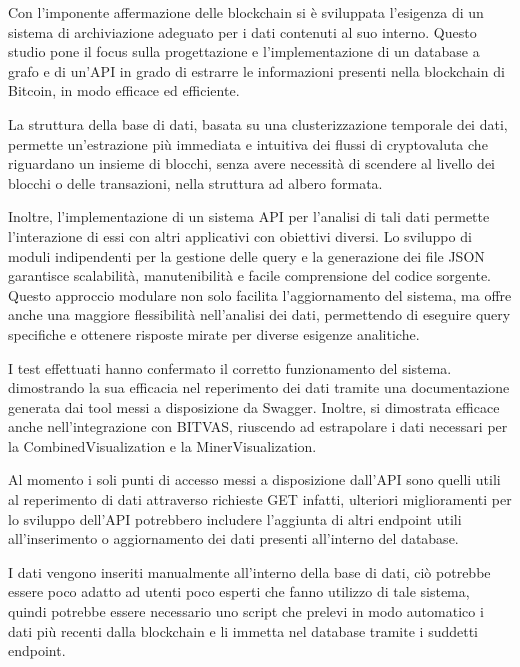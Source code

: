 
Con l'imponente affermazione delle blockchain si è  sviluppata l'esigenza di un sistema di archiviazione adeguato per i dati contenuti al suo interno.
Questo studio pone il focus sulla progettazione e l'implementazione di un database a grafo e di un'API in grado di estrarre le informazioni presenti nella blockchain di Bitcoin, in modo efficace ed efficiente.

La struttura della base di dati, basata su una clusterizzazione temporale dei dati, permette un'estrazione più immediata e intuitiva dei flussi di cryptovaluta che riguardano un insieme di blocchi, senza avere necessità di scendere al livello dei blocchi o delle transazioni, nella struttura ad albero formata.

Inoltre, l'implementazione di un sistema API per l'analisi di tali dati permette l'interazione di essi con altri applicativi con obiettivi diversi. Lo sviluppo di moduli indipendenti per la gestione delle query e la generazione dei file JSON  garantisce scalabilità, manutenibilità e facile comprensione del codice sorgente.
Questo approccio modulare non solo facilita l’aggiornamento del sistema, ma offre anche una maggiore flessibilità nell’analisi dei dati, permettendo di eseguire query specifiche e ottenere risposte mirate per diverse esigenze analitiche.

I test effettuati hanno confermato il corretto funzionamento del sistema. dimostrando la sua efficacia nel reperimento dei dati tramite una documentazione generata dai tool messi a disposizione da Swagger.
Inoltre, si  dimostrata efficace anche nell'integrazione con BITVAS, riuscendo ad estrapolare i dati necessari per la CombinedVisualization e la MinerVisualization.

Al momento i soli punti di accesso messi a disposizione dall'API sono quelli utili al reperimento di dati attraverso richieste GET infatti, ulteriori miglioramenti per lo sviluppo dell'API potrebbero includere l'aggiunta di altri endpoint utili all'inserimento o aggiornamento dei dati presenti all'interno del database.

I dati vengono inseriti manualmente all'interno della base di dati, ciò potrebbe essere poco adatto ad utenti poco esperti che fanno utilizzo di tale sistema, quindi potrebbe essere necessario uno script che prelevi in modo automatico i dati più recenti dalla blockchain e li immetta nel database tramite i suddetti endpoint.


